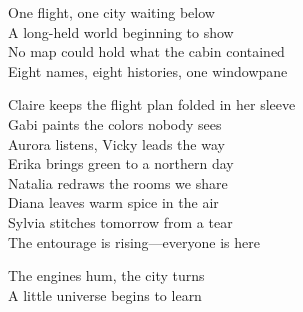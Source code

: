\begin{lyrics}
One flight, one city waiting below\\
A long-held world beginning to show\\
No map could hold what the cabin contained\\
Eight names, eight histories, one windowpane

Claire keeps the flight plan folded in her sleeve\\
Gabi paints the colors nobody sees\\
Aurora listens, Vicky leads the way\\
Erika brings green to a northern day\\
Natalia redraws the rooms we share\\
Diana leaves warm spice in the air\\
Sylvia stitches tomorrow from a tear\\
The entourage is rising—everyone is here

The engines hum, the city turns\\
A little universe begins to learn
\end{lyrics}

